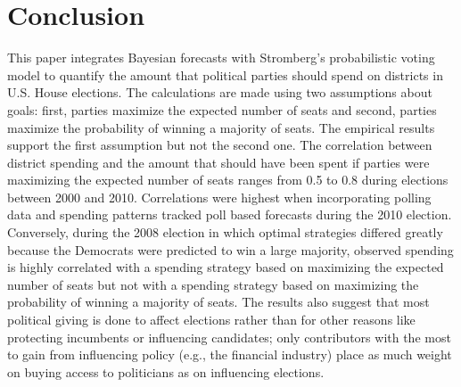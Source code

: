 \documentclass[12pt,final,fleqn]{article}
\theoremstyle{plain}
\begin{document}
\section{Conclusion} \label{sec:conclusion}
This paper integrates Bayesian forecasts with Stromberg's \citeyear{stromberg2008electoral} probabilistic voting model to quantify the amount that political parties should spend on districts in U.S. House elections. The calculations are made using two assumptions about goals: first, parties maximize the expected number of seats and second, parties maximize the probability of winning a majority of seats. The empirical results support the first assumption but not the second one. The correlation between district spending and the amount that should have been spent if parties were maximizing the expected number of seats ranges from 0.5 to 0.8 during elections between 2000 and 2010. Correlations were highest when incorporating polling data and spending patterns tracked poll based forecasts during the 2010 election. Conversely, during the 2008 election in which optimal strategies differed greatly because the Democrats were predicted to win a large majority, observed spending is highly correlated with a spending strategy based on maximizing the expected number of seats but not with a spending strategy based on maximizing the probability of winning a majority of seats. The results also suggest that most political giving is done to affect elections rather than for other reasons like protecting incumbents or influencing candidates; only contributors with the most to gain from influencing policy (e.g., the financial industry) place as much weight on buying access to politicians as on influencing elections.


\end{document}
